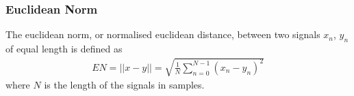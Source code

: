 \documentclass[../main2.tex]{subfiles}
\begin{document}
\subsubsection{Euclidean Norm}
The euclidean norm, or normalised euclidean distance, between two signals $x_n$, $y_n$ of equal length is defined as
\begin{align}
EN = ||x-y|| = \sqrt{\frac{1}{N}\sum_{n=0}^{N-1}(x_n-y_n)^2}
\end{align}
where $N$ is the length of the signals in samples.
\end{document}
